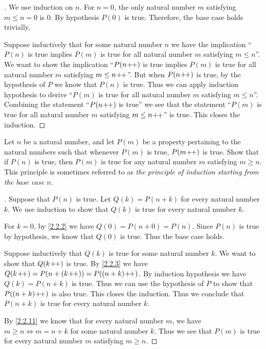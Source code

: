 \begin{proof}[]
  We use induction on \(n\).
  For \(n = 0\), the only natural number \(m\) satisfying \(m \leq n = 0\) is \(0\).
  By hypothesis \(P(0)\) is true.
  Therefore, the base case holds trivially.

  Suppose inductively that for some natural number \(n\) we have the implication ``\(P(n)\) is true implies \(P(m)\) is true for all natural number \(m\) satisfying \(m \leq n\)''.
  We want to show the implication ``\(P(n\!+\!\!+)\) is true implies \(P(m)\) is true for all natural number \(m\) satisfying \(m \leq n\!+\!\!+\)''.
  But when \(P(n\!+\!\!+)\) is true, by the hypothesis of \(P\) we know that \(P(n)\) is true.
  Thus we can apply induction hypothesis to derive ``\(P(m)\) is true for all natural number \(m\) satisfying \(m \leq n\)''.
  Combining the statement ``\(P(n\!+\!\!+)\) is true'' we see that the statement ``\(P(m)\) is true for all natural number \(m\) satisfying \(m \leq n\!+\!\!+\)'' is true.
  This closes the induction.
\end{proof}

\begin{ex}\label{ex:2.2.7}
  Let \(n\) be a natural number, and let \(P(m)\) be a property pertaining to the natural numbers such that whenever \(P(m)\) is true, \(P(m\!+\!\!+)\) is true.
  Show that if \(P(n)\) is true, then \(P(m)\) is true for any natural number \(m\) satisfying \(m \geq n\).
  This principle is sometimes referred to as \emph{the principle of induction starting from the base case \(n\)}.
\end{ex}

\begin{proof}[]
  Suppose that \(P(n)\) is true.
  Let \(Q(k) = P(n + k)\) for every natural number \(k\).
  We use induction to show that \(Q(k)\) is true for every natural number \(k\).

  For \(k = 0\), by \cref{2.2.2} we have \(Q(0) = P(n + 0) = P(n)\).
  Since \(P(n)\) is true by hypothesis, we know that \(Q(0)\) is true.
  Thus the base case holds.

  Suppose inductively that \(Q(k)\) is true for some natural number \(k\).
  We want to show that \(Q(k\!+\!\!+)\) is true.
  By \cref{2.2.3} we have \(Q(k\pp) = P(n + (k\pp)) = P((n + k)\pp)\).
  By induction hypothesis we have \(Q(k) = P(n + k)\) is true.
  Thus we can use the hypothesis of \(P\) to show that \(P((n + k)\!+\!\!+)\) is also true.
  This closes the induction.
  Thus we conclude that \(P(n + k)\) is true for every natural number \(k\).

  By \cref{2.2.11} we know that for every natural number \(m\), we have \(m \geq n \iff m = n + k\) for some natural number \(k\).
  Thus we see that \(P(m)\) is true for every natural number \(m\) satisfying \(m \geq n\).
\end{proof}
